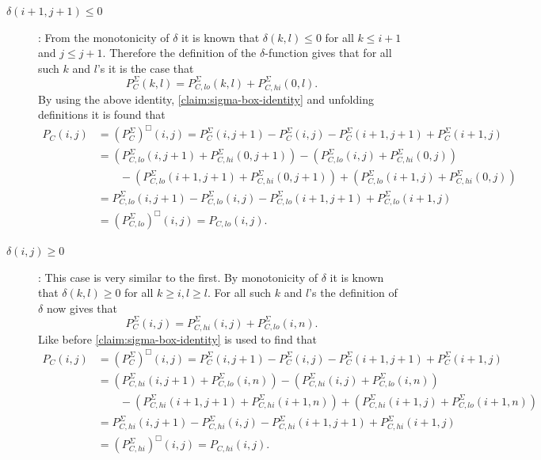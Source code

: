 \documentclass[twoside,11pt,openright]{report}
\begin{document}
\begin{description}
  \item[$\delta(i + 1, j + 1) \leq 0$]: From the monotonicity of $\delta$ it is known that $\delta(k, l) \leq 0$ for all $k \leq i + 1$ and $j \leq j + 1$. Therefore the definition of the $\delta$-function gives that for all such $k$ and $l$'s it is the case that
  \[
    P_C^{\Sigma}(k, l) = P_{C,lo}^{\Sigma}(k, l) + P_{C,hi}^{\Sigma}(0, l).
  \]
  By using the above identity, \cref{claim:sigma-box-identity} and unfolding definitions it is found that
  \begin{align*}
    P_C(i, j) &= (P_C^{\Sigma})^{\Box}(i, j) = P_C^{\Sigma}(i, j + 1) - P_C^{\Sigma}(i, j) - P_C^{\Sigma}(i + 1, j + 1) + P_C^{\Sigma}(i + 1, j) \\
    &= (P_{C,lo}^{\Sigma}(i, j + 1) + P_{C,hi}^{\Sigma}(0, j + 1)) - (P_{C,lo}^{\Sigma}(i, j) + P_{C,hi}^{\Sigma}(0, j)) \\&\quad\quad - (P_{C,lo}^{\Sigma}(i + 1, j + 1) + P_{C,hi}^{\Sigma}(0, j + 1)) + (P_{C,lo}^{\Sigma}(i + 1, j) + P_{C,hi}^{\Sigma}(0, j)) \\
    &= P_{C,lo}^{\Sigma}(i, j + 1) - P_{C,lo}^{\Sigma}(i, j) - P_{C,lo}^{\Sigma}(i + 1, j + 1) + P_{C,lo}^{\Sigma}(i + 1, j) \\
    &= (P_{C,lo}^{\Sigma})^{\Box}(i, j) = P_{C,lo}(i, j).
  \end{align*}

  \item[$\delta(i, j) \geq 0$]: This case is very similar to the first. By monotonicity of $\delta$ it is known that $\delta(k, l) \geq 0$ for all $k \geq i, l \geq l$. For all such $k$ and $l$'s the definition of $\delta$ now gives that
  \[
    P_C^{\Sigma}(i, j) = P_{C,hi}^{\Sigma}(i, j) + P_{C,lo}^{\Sigma}(i, n).
  \]
  Like before \cref{claim:sigma-box-identity} is used to find that
  \begin{align*}
    P_C(i, j) &= (P_C^{\Sigma})^{\Box}(i, j) = P_C^{\Sigma}(i, j + 1) - P_C^{\Sigma}(i, j) - P_C^{\Sigma}(i + 1, j + 1) + P_C^{\Sigma}(i + 1, j) \\
    &= (P_{C,hi}^{\Sigma}(i, j + 1) + P_{C,lo}^{\Sigma}(i, n)) - (P_{C,hi}^{\Sigma}(i, j) + P_{C,lo}^{\Sigma}(i, n)) \\&\quad\quad - (P_{C,hi}^{\Sigma}(i + 1, j + 1) + P_{C,hi}^{\Sigma}(i + 1, n)) + (P_{C,hi}^{\Sigma}(i + 1, j) + P_{C,lo}^{\Sigma}(i + 1, n)) \\
    &= P_{C,hi}^{\Sigma}(i, j + 1) - P_{C,hi}^{\Sigma}(i, j) - P_{C,hi}^{\Sigma}(i + 1, j + 1) + P_{C,hi}^{\Sigma}(i + 1, j) \\
    &= (P_{C,hi}^{\Sigma})^{\Box}(i, j) = P_{C,hi}(i, j).
  \end{align*}


\end{description}
\end{document}
